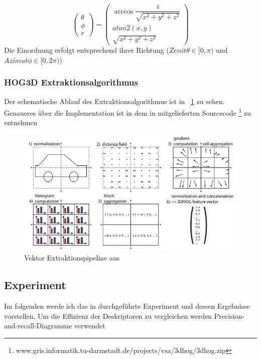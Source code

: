 \begin{equation}
\label{Sphere_Koord}
\begin{pmatrix}
	\theta \\ 
	 \phi \\ 
	 r
\end{pmatrix}
= \begin{pmatrix}
	\arccos\dfrac{z}{\sqrt{x^2+y^2+z^2}} \\ 
	 atan2(x,y) \\ 
	 \sqrt{x^2+y^2+z^2}
\end{pmatrix}
\end{equation}
Die Einordnung erfolgt entsprechend ihrer Richtung ($Zenit \theta \in [0,\pi) $ und $Azimut \phi \in [0,2\pi)$)  

\subsubsection{HOG3D Extraktionsalgorithmus }
Der schematische Ablauf des Extraktionsalgorithmus ist in \figurename~\ref{Vekt_ext_pipe} zu sehen. Genaueres über die Implementation ist in dem in \cite{scherer2010histograms} mitgelieferten Sourcecode \footnote{www.gris.informatik.tu-darmstadt.de/projects/vsa/3dhog/3dhog.zip} zu entnehmen 

 \begin{figure}[thpb]
 	\centering
 	\includegraphics[width=\linewidth]{2-Hauptteil/pics/HOG3D_extrac_pipe.png}
 	\caption{Vektor Extraktionspipeline aus \cite{scherer2010histograms}}
 	\label{Vekt_ext_pipe}
 \end{figure}
 
\subsection{Experiment}
Im folgenden werde ich das in \cite{scherer2010histograms} durchgeführte Experiment und dessen Ergebnisse vorstellen. Um die Effizienz der Deskriptoren zu vergleichen werden Precision-and-recall-Diagramme verwendet

